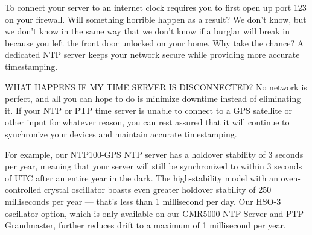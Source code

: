 \documentclass[a4paper,12pt, master]{etf}
\begin{document}
	To connect your server to an internet clock requires you to first open up port 123 on 
	your firewall. Will something horrible happen as a result? We don't know, but we don't 
	know in the same way that we don't know if a burglar will break in because you left the 
	front door unlocked on your home. Why take the chance? A dedicated NTP server keeps your 
	network secure while providing more accurate timestamping.

	WHAT HAPPENS IF MY TIME SERVER IS DISCONNECTED?
	No network is perfect, and all you can hope to do is minimize downtime instead of 
	eliminating it. If your NTP or PTP time server is unable to connect to a GPS satellite or 
	other input for whatever reason, you can rest assured that it will continue to 
	synchronize your devices and maintain accurate timestamping.

	For example, our NTP100-GPS NTP server has a holdover stability of 3 seconds per year, 
	meaning that your server will still be synchronized to within 3 seconds of UTC after an 
	entire year in the dark. The high-stability model with an oven-controlled crystal 
	oscillator boasts even greater holdover stability of 250 milliseconds per year — that's 
	less than 1 millisecond per day. Our HSO-3 oscillator option, which is only available on 
	our GMR5000 NTP Server and PTP Grandmaster, further reduces drift to a maximum of 1 
	millisecond per year. 

	\newpage
\end{document}
